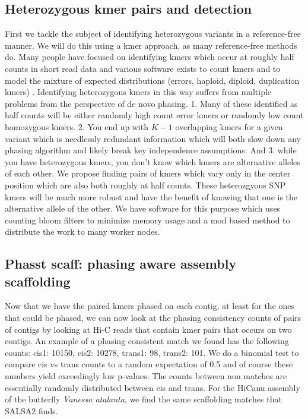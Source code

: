 {\subsection{Heterozygous kmer pairs and detection}
First we tackle the subject of identifying heterozygous variants in a reference-free manner. We will do this using a kmer approach, as many reference-free methods do. 
Many people have focused on identifying kmers which occur at roughly half counts in short read data \cite{KAT} and various software exists to count kmers \cite{jellyfish} 
and to model the mixture of expected distributions (errors, haploid, diploid, duplication kmers) \cite{genomescope}. Identifying heterozygous kmers in this way 
suffers from multiple problems from the perspective of de novo phasing. 1. Many of these identified as half counts will be either randomly high count error kmers or randomly low count 
homozygous kmers. 2. You end up with $K-1$ overlapping kmers for a given variant which is needlessly redundant information which will both slow down any phasing algorithm and 
likely break key independence assumptions. And 3. while you have heterozygous kmers, you don't know which kmers are alternative alleles of each other. 
We propose finding pairs of kmers which vary only in the center position which are also both roughly at half counts. These heterozgyous SNP kmers 
will be much more robust and have the benefit of knowing that one is the alternative allele of the other.
We have software for this purpose \cite{het_kmers} which uses counting bloom filters to minimize memory usage and a mod based method to 
distribute the work to many worker nodes.

\subsection{Phasst scaff: phasing aware assembly scaffolding}

\par{
Now that we have the paired kmers phased on each contig, at least for the ones that could be phased, we can now look at the phasing consistency counts of pairs of contigs by looking at Hi-C reads that contain kmer pairs that occurs on two contigs. An example of a phasing consistent match we found has the following counts:  cis1: 10150, cis2: 10278, trans1: 98, trans2: 101. We do a binomial test to compare cis vs trans counts to a random expectation of 0.5 and of course these numbers yield exceedingly low p-values. The counts between non matches are essentially randomly distributed between cis and trans. For the HiCanu assembly of the butterfly \textit{Vanessa atalanta}, we find the same scaffolding matches that SALSA2 finds.
}

}
